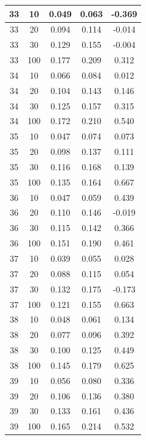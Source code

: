 \begin{longtable}{ |c|c|c|c|c| }
            33 & 10 & 0.049 & 0.063 & -0.369 \\ \hline
            33 & 20 & 0.094 & 0.114 & -0.014 \\ \hline
            33 & 30 & 0.129 & 0.155 & -0.004 \\ \hline
            33 & 100 & 0.177 & 0.209 & 0.312 \\ \hline
            34 & 10 & 0.066 & 0.084 & 0.012 \\ \hline
            34 & 20 & 0.104 & 0.143 & 0.146 \\ \hline
            34 & 30 & 0.125 & 0.157 & 0.315 \\ \hline
            34 & 100 & 0.172 & 0.210 & 0.540 \\ \hline
            35 & 10 & 0.047 & 0.074 & 0.073 \\ \hline
            35 & 20 & 0.098 & 0.137 & 0.111 \\ \hline
            35 & 30 & 0.116 & 0.168 & 0.139 \\ \hline
            35 & 100 & 0.135 & 0.164 & 0.667 \\ \hline
            36 & 10 & 0.047 & 0.059 & 0.439 \\ \hline
            36 & 20 & 0.110 & 0.146 & -0.019 \\ \hline
            36 & 30 & 0.115 & 0.142 & 0.366 \\ \hline
            36 & 100 & 0.151 & 0.190 & 0.461 \\ \hline
            37 & 10 & 0.039 & 0.055 & 0.028 \\ \hline
            37 & 20 & 0.088 & 0.115 & 0.054 \\ \hline
            37 & 30 & 0.132 & 0.175 & -0.173 \\ \hline
            37 & 100 & 0.121 & 0.155 & 0.663 \\ \hline
            38 & 10 & 0.048 & 0.061 & 0.134 \\ \hline
            38 & 20 & 0.077 & 0.096 & 0.392 \\ \hline
            38 & 30 & 0.100 & 0.125 & 0.449 \\ \hline
            38 & 100 & 0.145 & 0.179 & 0.625 \\ \hline
            39 & 10 & 0.056 & 0.080 & 0.336 \\ \hline
            39 & 20 & 0.106 & 0.136 & 0.380 \\ \hline
            39 & 30 & 0.133 & 0.161 & 0.436 \\ \hline
            39 & 100 & 0.165 & 0.214 & 0.532 \\ \hline

\end{longtable}
